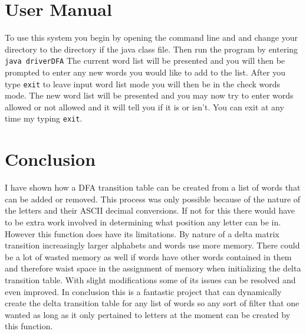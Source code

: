 \documentclass[letter, 12pt]{article}
\begin{document}
\section*{User Manual}
To use this system you begin by opening the command line and and change your directory to the directory if the java class file. Then run the program by entering 
\lstinline{java driverDFA}
The current word list will be presented and you will then be prompted to enter any new words you would like to add to the list. After you type \lstinline{exit} to leave input word list mode you will then be in the check words mode. The new word list will be presented and you may now try to enter words allowed or not allowed and it will tell you if it is or isn't. You can exit at any time my typing \lstinline{exit}.
 
\section*{Conclusion}
I have shown how a DFA  transition table can be created from a list of words that can be added or removed. This process was only possible because of the nature of the letters and their ASCII decimal conversions. If not for this there would have to be extra work involved in determining what position any letter can be in. However this function does have its limitations. By nature of a delta matrix transition increasingly larger alphabets and words use more memory. There could be a lot of wasted memory as well if words have other words contained in them and therefore waist space in the assignment of memory when initializing the delta transition table. With slight modifications some of its issues can be resolved and even improved. In conclusion this is a fantastic project that can dynamically create the delta transition table for any list of words so any sort of filter that one wanted as long as it only pertained to letters at the moment can be created by this function. 






\end{document}
